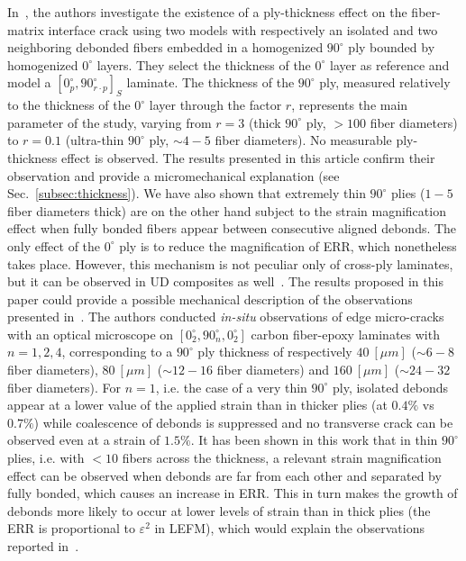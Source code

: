 \documentclass[review]{elsarticle}
\begin{document}
In~\cite{Velasco2018, Paris2018}, the authors investigate the existence of a ply-thickness effect on the fiber-matrix interface crack using two models with respectively an isolated and two neighboring debonded fibers embedded in a homogenized $90^{\circ}$ ply bounded by homogenized $0^{\circ}$ layers. They select the thickness of the $0^{\circ}$ layer as reference and model a $\left[0^{\circ}_{p},90^{\circ}_{r\cdot p}\right]_{S}$ laminate. The thickness of the $90^{\circ}$ ply, measured relatively to the thickness of the $0^{\circ}$ layer through the factor $r$, represents the main parameter of the study, varying from $r=3$ (thick $90^{\circ}$ ply, $>100$ fiber diameters) to $r=0.1$ (ultra-thin $90^{\circ}$ ply, $\sim4-5$ fiber diameters). No measurable ply-thickness effect is observed. The results presented in this article confirm their observation and provide a micromechanical explanation (see Sec.~\ref{subsec:thickness}). We have also shown that extremely thin $90^{\circ}$ plies ($1-5$ fiber diameters thick) are on the other hand subject to the strain magnification effect when fully bonded fibers appear between consecutive aligned debonds. The only effect of the $0^{\circ}$ ply is to reduce the magnification of ERR, which nonetheless takes place. However, this mechanism is not peculiar only of cross-ply laminates, but it can be observed in UD composites as well~\cite{DiStasio2019}. The results proposed in this paper could provide a possible mechanical description of the observations presented in~\cite{Saito2012}. The authors conducted \emph{in-situ} observations of edge micro-cracks with an optical microscope on $\left[0^{\circ}_{2},90^{\circ}_{n},0^{\circ}_{2}\right]$ carbon fiber-epoxy laminates with $n=1,2,4$, corresponding to a $90^{\circ}$ ply thickness of respectively $40\ [\mu m]$ ($\sim 6-8$ fiber diameters), $80\ [\mu m]$  ($\sim 12-16$ fiber diameters) and $160\ [\mu m]$  ($\sim 24-32$ fiber diameters). For $n=1$, i.e. the case of a very thin $90^{\circ}$ ply, isolated debonds appear at a lower value of the applied strain than in thicker plies (at $0.4\%$ vs $0.7\%$) while coalescence of debonds is suppressed and no transverse crack can be observed even at a strain of $1.5\%$. It has been shown in this work that in thin $90^{\circ}$ plies, i.e. with $<10$ fibers across the thickness, a relevant strain magnification effect can be observed when debonds are far from each other and separated by fully bonded, which causes an increase in ERR. This in turn makes the growth of debonds more likely to occur at lower levels of strain than in thick plies (the ERR is proportional to $\varepsilon^{2}$ in LEFM), which would explain the observations reported in~\cite{Saito2012}.
\end{document}
